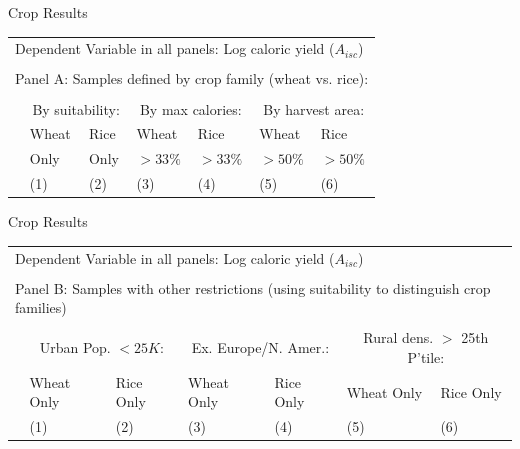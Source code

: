 \documentclass[10pt, xcolor=dvipsnames]{beamer}
\begin{document}
\begin{frame}{Crop Results}\label{cropreg}
{\footnotesize
\begin{tabularx}{\textwidth}{lXXXXXX}
\midrule
\multicolumn{7}{l}{Dependent Variable in all panels: Log caloric yield ($A_{isc}$)} \\ \\
\multicolumn{7}{l}{Panel A: Samples defined by crop family (wheat vs. rice):} \\ \\
 & \multicolumn{2}{c}{By suitability:} & \multicolumn{2}{c}{By max calories:} & \multicolumn{2}{c}{By harvest area:}\\ \cmidrule(lr){2-3} \cmidrule(lr){4-5} \cmidrule(lr){6-7} 
 & Wheat & Rice & Wheat  & Rice  & Wheat  & Rice \\
 & Only & Only &  $>33\%$ & $>33\%$ & $>50\%$ & $>50\%$   \\
 & (1) & (2) & (3) & (4) & (5) & (6) \\
\midrule

\midrule
\end{tabularx}
}

\hfill \hyperlink{crop}{}
\end{frame}

\begin{frame}{Crop Results}

{\footnotesize
\begin{tabularx}{\textwidth}{lXXXXXX}
\midrule
\multicolumn{7}{l}{Dependent Variable in all panels: Log caloric yield ($A_{isc}$)} \\ \\
\multicolumn{7}{l}{Panel B: Samples with other restrictions (using suitability to distinguish crop families)} \\ \\
 & \multicolumn{2}{c}{Urban Pop. $<25K$:} & \multicolumn{2}{c}{Ex. Europe/N. Amer.:} & \multicolumn{2}{c}{Rural dens. $>$ 25th P'tile:}\\ \cmidrule(lr){2-3} \cmidrule(lr){4-5} \cmidrule(lr){6-7}
  & Wheat Only& Rice Only & Wheat Only& Rice Only& Wheat Only& Rice Only\\
 & (1) & (2) & (3) & (4) & (5) & (6) \\
\midrule

\midrule
\end{tabularx}
}
\end{frame}
\end{document}
